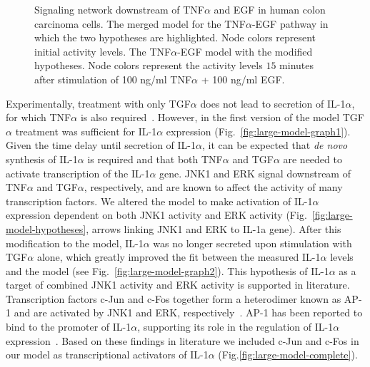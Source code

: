 \begin{figure}[!htpb]
\caption{Signaling network downstream of TNF$\alpha$ and EGF in human colon carcinoma cells.
{\bf \protect{}} The merged model for the TNF$\alpha$-EGF pathway in which the two hypotheses are highlighted. Node colors represent initial activity levels.
{\bf \protect{}} The TNF$\alpha$-EGF model with the modified hypotheses. Node colors represent the activity levels $15$ minutes
after stimulation of 100 ng/ml TNF$\alpha$ + 100 ng/ml EGF.}\label{fig:large-model-all}
\end{figure}


Experimentally,
treatment with only TGF$\alpha$ does not lead to secretion of IL-1$\alpha$, for which
 TNF$\alpha$ is also required~\citep{pathway-autocrine}.
However, in the first version of the model TGF$\alpha$ treatment was sufficient for
 IL-1$\alpha$ expression (Fig.~\ref{fig:large-model-graph1}). Given the time delay until secretion of IL-1$\alpha$, it can be
 expected that \emph{de novo} synthesis of IL-1$\alpha$ is required and that both
 TNF$\alpha$ and TGF$\alpha$ are needed to activate transcription of the IL-1$\alpha$ gene.
 JNK1 and ERK signal downstream of TNF$\alpha$ and TGF$\alpha$, respectively, and are known
to affect the activity of many transcription factors. We altered the model to make
 activation of IL-1$\alpha$ expression dependent on both JNK1 activity and ERK activity
(Fig.~\ref{fig:large-model-hypotheses}, arrows linking {\sf JNK1} and {\sf ERK} to {\sf IL-1a gene}).
 After this modification to the model, IL-1$\alpha$ was no longer secreted
upon stimulation with TGF$\alpha$ alone, which greatly improved the fit between the measured IL-1$\alpha$ levels and the model (see
 Fig.~\ref{fig:large-model-graph2}). This hypothesis of IL-1$\alpha$ as a target of combined JNK1 activity and
 ERK activity is supported in literature. Transcription factors c-Jun and c-Fos together
 form a heterodimer known as AP-1 and are activated by JNK1 and ERK,
respectively~\citep{jnk-signaling,cfos-cjun}. AP-1 has been reported to bind to the
 promoter of IL-1$\alpha$, supporting its role in the regulation of IL-1$\alpha$
 expression~\citep{ap1-il1a}. Based on these findings in literature we included c-Jun and
c-Fos in our model as transcriptional activators of IL-1$\alpha$ (Fig.\ref{fig:large-model-complete}).


